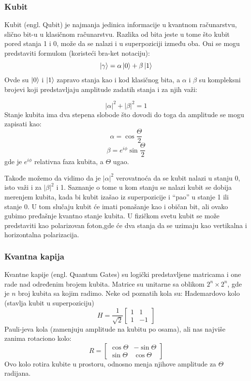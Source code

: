 \documentclass[12pt, letterpaper, oneside]{article}
\begin{document}
\subsubsection*{Kubit}
Kubit (engl. Qubit) je najmanja jedinica informacije u kvantnom računarstvu, slično bit-u u klasičnom računarstvu.
Razlika od bita jeste u tome što kubit pored stanja 1 i 0, može da se nalazi i u superpoziciji između oba.
Oni se mogu predstaviti formulom (koristeći bra-ket notaciju):
\[ \ket{\gamma} =  \alpha\ket{0}+\beta\ket{1} \]
Ovde su $\ket{0}$ i $\ket{1}$ zapravo stanja kao i kod klasičnog bita, a $\alpha$ i $\beta$ su kompleksni brojevi koji predstavljaju amplitude zadatih stanja i za njih važi:

\[ |\alpha|^2+|\beta|^2 = 1 \]
Stanje kubita ima dva stepena slobode što dovodi do toga da amplitude se mogu zapisati kao:
\[
    \alpha = \cos{\frac{\Theta}{2}} 
\]
\[
    \beta = e^{i\phi}\sin{\frac{\Theta}{2}}
\]
gde je $e^{i\phi}$ relativna faza kubita, a $\Theta$ ugao.

Takođe možemo da vidimo da je $|\alpha|^2$ verovatnoća da se kubit nalazi u stanju 0, isto važi i za $ |\beta|^2$ i 1.
Saznanje o tome u kom stanju se nalazi kubit se dobija merenjem kubita, kada bi kubit izašao iz superpozicije i ``pao'' u stanje 1 ili stanje 0. U tom slučaju kubit će imati ponašanje kao i običan bit, ali ovako gubimo pređašnje kvantno stanje kubita.
U fizičkom svetu kubit se može predstaviti kao polarizovan foton,gde će dva stanja da se uzimaju kao vertikalna i horizontalna polarizacija.
\subsubsection*{Kvantna kapija}
Kvantne kapije (engl. Quantum Gates) su logički predstavljene matricama i one rade nad određenim brojem kubita.
Matrice su unitarne sa oblikom $2^n \times 2^n$, gde je $n$ broj kubita sa kojim radimo. Neke od poznatih kola su: Hademardovo kolo (stavlja kubit u superpoziciju)
\[
    H = \frac{1}{\sqrt{2}}\begin{bmatrix}
        1 & 1 \\
        1 & -1
    \end{bmatrix}
\]
Pauli-jeva kola (zamenjuju amplitude na kubitu po osama), ali nas najviše zanima rotaciono kolo:
\[
    R = \begin{bmatrix}
        \cos{\Theta} & -\sin{\Theta} \\
        \sin{\Theta} & \cos{\Theta} 
    \end{bmatrix}
\]
Ovo kolo rotira kubite u prostoru, odnosno menja njihove amplitude za $\Theta$ radijana.
\end{document}
